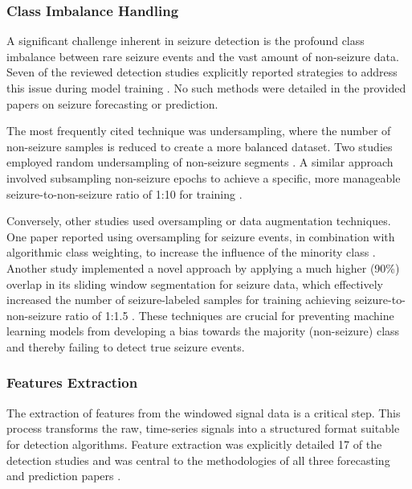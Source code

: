 \subsubsection{Class Imbalance Handling}
A significant challenge inherent in seizure detection is the profound class imbalance between rare seizure events and the vast amount of non-seizure data. Seven of the reviewed detection studies explicitly reported strategies to address this issue during model training \cite{Yu2023-ss, Wang2022-lt, Wu2024-yl, Nasseri2021-xn, Vakilna2024-hk, Larsen2024-vn, Tang2021-td}. No such methods were detailed in the provided papers on seizure forecasting or prediction.

The most frequently cited technique was undersampling, where the number of non-seizure samples is reduced to create a more balanced dataset. Two studies employed random undersampling of non-seizure segments \cite{Yu2023-ss, Tang2021-td}. A similar approach involved subsampling non-seizure epochs to achieve a specific, more manageable seizure-to-non-seizure ratio of 1:10 for training \cite{Vakilna2024-hk}.

Conversely, other studies used oversampling or data augmentation techniques. One paper reported using oversampling for seizure events, in combination with algorithmic class weighting, to increase the influence of the minority class \cite{Larsen2024-vn}. Another study implemented a novel approach by applying a much higher (90\%) overlap in its sliding window segmentation for seizure data, which effectively increased the number of seizure-labeled samples for training achieving seizure-to-non-seizure ratio of 1:1.5 \cite{Wang2022-lt}. These techniques are crucial for preventing machine learning models from developing a bias towards the majority (non-seizure) class and thereby failing to detect true seizure events.


\subsubsection{Features Extraction}
The extraction of features from the windowed signal data is a critical step. This process transforms the raw, time-series signals into a structured format suitable for detection algorithms. Feature extraction was explicitly detailed 17 of the detection studies \cite{Milosevic2016-ee, De_Cooman2018-pq, Hamlin2021-sd, Wang2022-lt, Poh2012-af, Wu2024-yl, Chowdhury2022-bi, Gheryani2017-yg, Ge2023-ab, Vakilna2024-hk, Larsen2024-vn, Dong2022-oo, Li2022-ty, Xu2022-tx, Wang2025-ql, Regalia2019-ch, Wang2025-my} and was central to the methodologies of all three forecasting and prediction papers \cite{Meisel2020-ii, Vieluf2023-zv, Vieluf2023-ta}.

